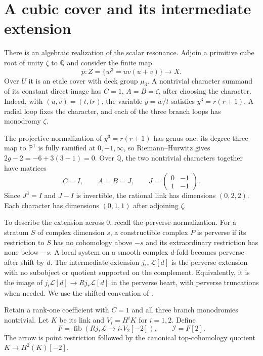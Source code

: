 \section{A cubic cover and its intermediate extension}
\label{cycoll:sec:cubic}

There is an algebraic realization of the scalar resonance.
Adjoin a primitive cube root of unity $\zeta$ to $\mathbb Q$
and consider the finite map
\begin{equation}\label{cycoll:eq:cubic}
 p:Z=\{w^3=uv(u+v)\}\longrightarrow X.
\end{equation}
Over $U$ it is an etale cover with deck group $\mu_3$.
A nontrivial character summand of its constant direct image
has $C=1$, $A=B=\zeta$, after choosing the character.
Indeed, with $(u,v)=(t,tr)$, the variable $y=w/t$ satisfies
$y^3=r(r+1)$. A radial loop fixes the character, and each
of the three branch loops has monodromy $\zeta$.

The projective normalization of $y^3=r(r+1)$ has genus one:
its degree-three map to $\mathbb P^1$ is fully ramified at
$0,-1,\infty$, so Riemann--Hurwitz gives
$2g-2=-6+3(3-1)=0$. Over $\mathbb Q$, the two nontrivial
characters together have matrices
\[
 C=I,\qquad A=B=J,\qquad
 J=\begin{pmatrix}0&-1\\1&-1\end{pmatrix}.
\]
Since $J^3=I$ and $J-I$ is invertible, the rational link
has dimensions $(0,2,2)$. Each character has dimensions
$(0,1,1)$ after adjoining $\zeta$.

To describe the extension across $0$, recall the perverse
normalization. For a stratum $S$ of complex dimension $s$,
a constructible complex $P$ is perverse if its restriction
to $S$ has no cohomology above $-s$ and its extraordinary
restriction has none below $-s$. A local system on a smooth
complex $d$-fold becomes perverse after shift by $d$.
The intermediate extension $j_{!*}\mathcal L[d]$ is the
perverse extension with no subobject or quotient supported
on the complement. Equivalently, it is the image of
$j_!\mathcal L[d]\to Rj_*\mathcal L[d]$ in the perverse
heart, with perverse truncations when needed. We use the
shifted convention of \cite[\S15.6]{cycoll:Goresky}.

Retain a rank-one coefficient with $C=1$ and all three
branch monodromies nontrivial. Let $K$ be its link and
$V_i=H^iK$ for $i=1,2$. Define
\begin{equation}\label{cycoll:eq:middle}
 F=\operatorname{fib}\left(Rj_*\mathcal L
             \longrightarrow i_*V_2[-2]\right),
 \qquad \mathcal I=F[2].
\end{equation}
The arrow is point restriction followed by the canonical
top-cohomology quotient $K\to H^2(K)[-2]$.

